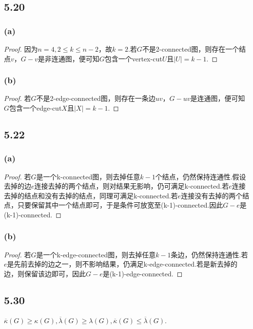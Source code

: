 \documentclass[twocolumn]{article}
\newenvironment{SChinese}{%
	\CJKfamily{gbsn}%
	\CJKtilde
	\CJKnospace}{}
\begin{document}
\begin{CJK}{UTF8}{}
\begin{SChinese}
				\subsection*{5.20}
					\subsubsection*{(a)}
						\begin{proof}
							因为$n=4,2\le k\le n-2$，故$k=2$.若$G$不是2-connected图，则存在一个结点$v$，$G-v$是非连通图，便可知$G$包含一个vertex-cut$U$且$|U|=k-1$.
						\end{proof}
					\subsubsection*{(b)}
						\begin{proof}
							若$G$不是2-edge-connected图，则存在一条边$uv$，$G-{uv}$是连通图，便可知$G$包含一个edge-cut$X$且$|X|=k-1$.
						\end{proof}
				\subsection*{5.22}
					\subsubsection*{(a)}
						\begin{proof}
							若$G$是一个k-connected图，则去掉任意$k-1$个结点，仍然保持连通性.假设去掉的边$e$连接去掉的两个结点，则对结果无影响，仍可满足k-connected.若$e$连接去掉的结点和没有去掉的结点，同理可满足k-connected.若$e$连接没有去掉的两个结点，只要保留其中一个结点即可，于是条件可放宽至(k-1)-connected.因此$G-e$是(k-1)-connected.
						\end{proof}
					\subsubsection*{(b)}
						\begin{proof}
							若$G$是一个k-edge-connected图，则去掉任意$k-1$条边，仍然保持连通性.若$e$是先前去掉的边之一，则不影响结果，仍满足k-edge-connected.若是新去掉的边，则保留该边即可，因此$G-e$是(k-1)-edge-connected.
						\end{proof}
				\subsection*{5.30}
					$\overline{\kappa}(G)\ge\kappa(G),\overline{\lambda}(G)\ge\lambda(G),\overline{\kappa}(G)\le\overline{\lambda}(G)$.

\end{SChinese}
\end{CJK}
\end{document}
